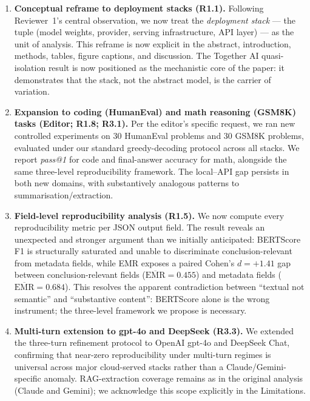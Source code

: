 \documentclass[11pt,a4paper]{article}
\begin{document}
\begin{enumerate}
  \item \textbf{Conceptual reframe to deployment stacks (R1.1).} Following Reviewer~1's central observation, we now treat the \emph{deployment stack} --- the tuple (model weights, provider, serving infrastructure, API layer) --- as the unit of analysis. This reframe is now explicit in the abstract, introduction, methods, tables, figure captions, and discussion. The Together AI quasi-isolation result is now positioned as the mechanistic core of the paper: it demonstrates that the stack, not the abstract model, is the carrier of variation.

  \item \textbf{Expansion to coding (HumanEval) and math reasoning (GSM8K) tasks (Editor; R1.8; R3.1).} Per the editor's specific request, we ran new controlled experiments on 30 HumanEval problems and 30 GSM8K problems, evaluated under our standard greedy-decoding protocol across all stacks. We report \emph{pass@1} for code and final-answer accuracy for math, alongside the same three-level reproducibility framework. The local--API gap persists in both new domains, with substantively analogous patterns to summarisation/extraction.

  \item \textbf{Field-level reproducibility analysis (R1.5).} We now compute every reproducibility metric per JSON output field. The result reveals an unexpected and stronger argument than we initially anticipated: BERTScore F1 is structurally saturated and unable to discriminate conclusion-relevant from metadata fields, while EMR exposes a paired Cohen's $d=+1.41$ gap between conclusion-relevant fields ($\overline{\text{EMR}}=0.455$) and metadata fields ($\overline{\text{EMR}}=0.684$). This resolves the apparent contradiction between ``textual not semantic'' and ``substantive content'': BERTScore alone is the wrong instrument; the three-level framework we propose is necessary.

  \item \textbf{Multi-turn extension to gpt-4o and DeepSeek (R3.3).} We extended the three-turn refinement protocol to OpenAI gpt-4o and DeepSeek Chat, confirming that near-zero reproducibility under multi-turn regimes is universal across major cloud-served stacks rather than a Claude/Gemini-specific anomaly. RAG-extraction coverage remains as in the original analysis (Claude and Gemini); we acknowledge this scope explicitly in the Limitations.


\end{enumerate}
\end{document}
